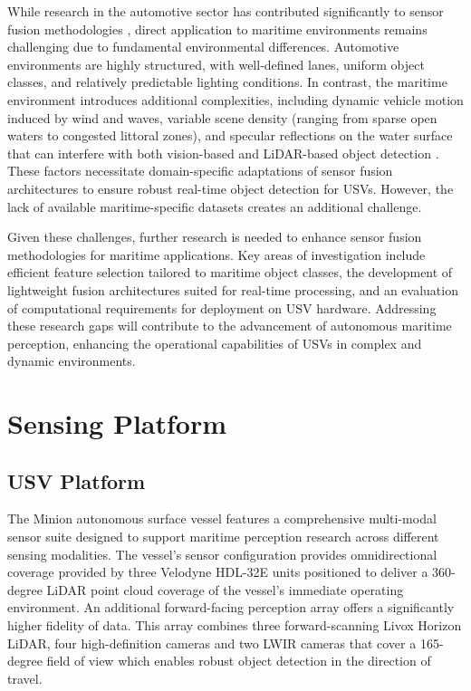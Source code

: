 \documentclass{erauthesis}
\begin{document}
While research in the automotive sector has contributed significantly to sensor fusion methodologies \cite{yeong2021,clunie2021,roriz2022,cui2022,das2022,liu2023a}, direct application to maritime environments remains challenging due to fundamental environmental differences. 
Automotive environments are highly structured, with well-defined lanes, uniform object classes, and relatively predictable lighting conditions. 
In contrast, the maritime environment introduces additional complexities, including dynamic vehicle motion induced by wind and waves, variable scene density (ranging from sparse open waters to congested littoral zones), and specular reflections on the water surface that can interfere with both vision-based \cite{liu2023a} and \ac{LiDAR}-based object detection \cite{ahmed2024}.%
These factors necessitate domain-specific adaptations of sensor fusion architectures to ensure robust real-time object detection for \acp{USV}. 
However, the lack of available maritime-specific datasets \cite{jun-hwa2022,su2023,thompson2023} creates an additional challenge.

Given these challenges, further research is needed to enhance sensor fusion methodologies for maritime applications. 
Key areas of investigation include efficient feature selection tailored to maritime object classes, the development of lightweight fusion architectures suited for real-time processing, and an evaluation of computational requirements for deployment on \ac{USV} hardware. 
Addressing these research gaps will contribute to the advancement of autonomous maritime perception, enhancing the operational capabilities of \acp{USV} in complex and dynamic environments.

\chapter{Sensing Platform}

    \section{USV Platform}

The Minion autonomous surface vessel features a comprehensive multi-modal sensor suite designed to support maritime perception research across different sensing modalities.
The vessel's sensor configuration provides omnidirectional coverage provided by three Velodyne HDL-32E units positioned to deliver a 360-degree \ac{LiDAR} point cloud coverage of the vessel's immediate operating environment.
An additional forward-facing perception array offers a significantly higher fidelity of data.
This array combines three forward-scanning Livox Horizon \ac{LiDAR}, four high-definition cameras and two \ac{LWIR} cameras that cover a 165-degree field of view which enables robust object detection in the direction of travel.
\end{document}
